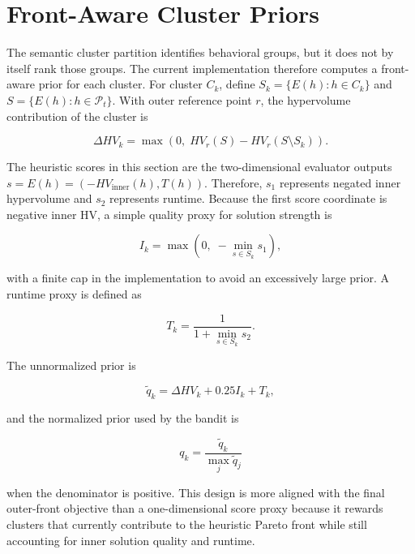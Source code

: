 \documentclass[../main.tex]{subfiles}
\begin{document}
\section{Front-Aware Cluster Priors}
\label{sec:front-aware-priors}

The semantic cluster partition identifies behavioral groups, but it does not by itself rank those groups. The current implementation therefore computes a front-aware prior for each cluster. For cluster $C_k$, define $S_k=\{E(h):h \in C_k\}$ and $S=\{E(h):h \in \mathcal{P}_t\}$. With outer reference point $r$, the hypervolume contribution of the cluster is

\begin{equation}
  \Delta HV_k
  =
  \max\left(0,\;HV_r(S)-HV_r(S\setminus S_k)\right).
\end{equation}

The heuristic scores in this section are the two-dimensional evaluator outputs $s=E(h)=(-HV_{\text{inner}}(h),T(h))$. Therefore, $s_1$ represents negated inner hypervolume and $s_2$ represents runtime. Because the first score coordinate is negative inner HV, a simple quality proxy for solution strength is

\begin{equation}
  I_k = \max\left(0,\;-\min_{s \in S_k} s_1\right),
\end{equation}

with a finite cap in the implementation to avoid an excessively large prior. A runtime proxy is defined as

\begin{equation}
  T_k = \frac{1}{1+\min_{s \in S_k} s_2}.
\end{equation}

The unnormalized prior is

\begin{equation}
  \tilde{q}_k = \Delta HV_k + 0.25 I_k + T_k,
\end{equation}

and the normalized prior used by the bandit is

\begin{equation}
  q_k = \frac{\tilde{q}_k}{\max_j \tilde{q}_j}
\end{equation}

when the denominator is positive. This design is more aligned with the final outer-front objective than a one-dimensional score proxy because it rewards clusters that currently contribute to the heuristic Pareto front while still accounting for inner solution quality and runtime.
\end{document}
